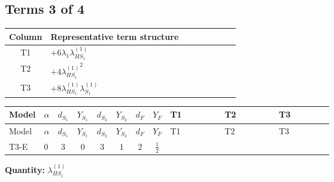 \documentclass[8pt]{article}
\begin{document}
\begin{landscape}
\subsection*{Terms 3 of 4}
\begin{center}
\begin{tabular}{@{}c >{\raggedright\arraybackslash}p{0.82\linewidth}@{}}
\toprule
Column & Representative term structure \\
\midrule
T1 & \(\displaystyle +6 {\lambda_1} {\lambda_{HS_1}^{(1)}}\) \\
\midrule
T2 & \(\displaystyle +4 {\lambda_{HS_1}^{(1)}}^2\) \\
\midrule
T3 & \(\displaystyle +8 {\lambda_{HS_1}^{(1)}} {\lambda_{S_1}^{(1)}}\) \\
\midrule
\bottomrule
\end{tabular}
\end{center}
\smallskip
\tiny
\begin{longtable}{@{}llcccccc >{\raggedright\arraybackslash}p{0.21\linewidth} >{\raggedright\arraybackslash}p{0.21\linewidth} >{\raggedright\arraybackslash}p{0.21\linewidth}@{}}
\toprule
Model & $\alpha$ & $d_{S_1}$ & $Y_{S_1}$ & $d_{S_2}$ & $Y_{S_2}$ & $d_F$ & $Y_F$ & T1 & T2 & T3 \\
\midrule
\endfirsthead
\toprule
Model & $\alpha$ & $d_{S_1}$ & $Y_{S_1}$ & $d_{S_2}$ & $Y_{S_2}$ & $d_F$ & $Y_F$ & T1 & T2 & T3 \\
\midrule
\endhead
T3-E & $0$ & $3$ & $0$ & $3$ & $1$ & $2$ & $\frac{1}{2}$ & \scriptsize\adjustbox{max width=\linewidth}{$\begin{gathered} +6 {\lambda_1} {\lambda_{HS_1}^{(1)}}\end{gathered}$} & \scriptsize\adjustbox{max width=\linewidth}{$\begin{gathered} +4 {\lambda_{HS_1}^{(1)}}^2\end{gathered}$} & \scriptsize\adjustbox{max width=\linewidth}{$\begin{gathered} +8 {\lambda_{HS_1}^{(1)}} {\lambda_{S_1}^{(1)}}\end{gathered}$} \\
\midrule
\bottomrule
\end{longtable}
\clearpage
\noindent\textbf{Quantity: }$\lambda_{HS_1}^{(1)}$\par\smallskip

\end{landscape}
\end{document}
